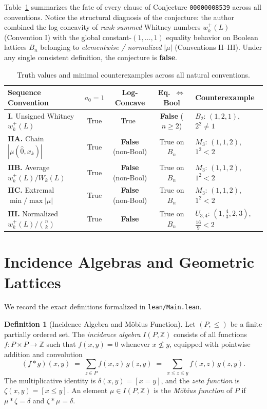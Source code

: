 \documentclass[11pt]{article}
\theoremstyle{definition}
\newtheorem{definition}[theorem]{Definition}
\theoremstyle{remark}
\newcommand{\hatzero}{\hat{0}}
\newcommand{\Z}{\mathbb{Z}}
\begin{document}
Table~\ref{tab:summary} summarizes the fate of every clause of Conjecture \texttt{00000008539} across all conventions. Notice the structural diagnosis of the conjecture: the author combined the log-concavity of \emph{rank-summed} Whitney numbers $w_k^+(L)$ (Convention I) with the global constant-$(1,\dots,1)$ equality behavior on Boolean lattices $B_n$ belonging to \emph{elementwise / normalized} $|\mu|$ (Conventions II--III). Under any single consistent definition, the conjecture is \textbf{false}.

\begin{table}[ht]
\centering
\small
\setlength{\tabcolsep}{4.5pt}
\renewcommand{\arraystretch}{1.28}
\begin{tabular}{@{}>{\raggedright\arraybackslash}p{3.95cm}ccc>{\raggedright\arraybackslash}p{3.65cm}@{}}
\hline
\textbf{Sequence Convention} & $a_0 = 1$ & \textbf{Log-Concave} & \textbf{Eq.\ $\Leftrightarrow$ Bool} & \textbf{Counterexample} \\
\hline
\textbf{I.} Unsigned Whitney $w_k^+(L)$ & True & True~\cite{AHK2018} & \textbf{False} ($n \ge 2$) & $B_2$: $(1,2,1)$, $2^2 \neq 1$ \\
\textbf{IIA.} Chain $|\mu(\hatzero, x_k)|$ & True & \textbf{False} (non-Bool) & True on $B_n$ & $M_3$: $(1,1,2)$, $1^2 < 2$ \\
\textbf{IIB.} Average $w_k^+(L)/W_k(L)$ & True & \textbf{False} (non-Bool) & True on $B_n$ & $M_3$: $(1,1,2)$, $1^2 < 2$ \\
\textbf{IIC.} Extremal $\min/\max |\mu|$ & True & \textbf{False} (non-Bool) & True on $B_n$ & $M_3$: $(1,1,2)$, $1^2 < 2$ \\
\textbf{III.} Normalized $w_k^+(L)/\binom{n}{k}$ & True & \textbf{False} & True on $B_n$ & $U_{3,4}$: $(1,\tfrac{4}{3},2,3)$, $\tfrac{16}{9} < 2$ \\
\hline
\end{tabular}
\caption{Truth values and minimal counterexamples across all natural conventions.}
\label{tab:summary}
\end{table}

\section{Incidence Algebras and Geometric Lattices}

We record the exact definitions formalized in \texttt{lean/Main.lean}.

\begin{definition}[Incidence Algebra and M\"obius Function]
Let $(P, \le)$ be a finite partially ordered set. The \emph{incidence algebra} $I(P, \Z)$ consists of all functions $f : P \times P \to \Z$ such that $f(x, y) = 0$ whenever $x \not\le y$, equipped with pointwise addition and convolution
\[
  (f * g)(x, y) \;=\; \sum_{z \in P} f(x, z)\,g(z, y) \;=\; \sum_{x \le z \le y} f(x, z)\,g(z, y).
\]
The multiplicative identity is $\delta(x, y) = [x = y]$, and the \emph{zeta function} is $\zeta(x, y) = [x \le y]$. An element $\mu \in I(P, \Z)$ is the \emph{M\"obius function} of $P$ if $\mu * \zeta = \delta$ and $\zeta * \mu = \delta$.
\end{definition}
\end{document}
